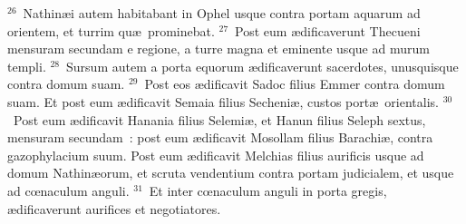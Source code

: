 ${}^{26}$~Nathin\ae i autem habitabant in Ophel usque contra portam aquarum ad orientem, et turrim qu\ae\ prominebat.
${}^{27}$~Post eum \ae dificaverunt Thecueni mensuram secundam e regione, a turre magna et eminente usque ad murum templi.
${}^{28}$~Sursum autem a porta equorum \ae dificaverunt sacerdotes, unusquisque contra domum suam.
${}^{29}$~Post eos \ae dificavit Sadoc filius Emmer contra domum suam. Et post eum \ae dificavit Semaia filius Secheni\ae , custos port\ae\ orientalis.
${}^{30}$~Post eum \ae dificavit Hanania filius Selemi\ae , et Hanun filius Seleph sextus, mensuram secundam~: post eum \ae dificavit Mosollam filius Barachi\ae , contra gazophylacium suum. Post eum \ae dificavit Melchias filius aurificis usque ad domum Nathin\ae orum, et scruta vendentium contra portam judicialem, et usque ad cœnaculum anguli.
${}^{31}$~Et inter cœnaculum anguli in porta gregis, \ae dificaverunt aurifices et negotiatores.

